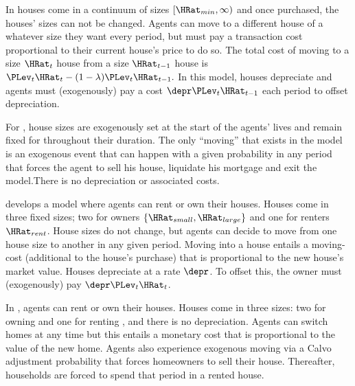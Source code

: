 \documentclass[PortfolioChoiceWithRiskyHousing]{subfiles}
\begin{document}
In \cite{Cocco2004rfs} houses come in a continuum of sizes $[\HRat_{min},\infty)$ and once purchased, the houses' sizes can not be changed. Agents can move to a different house of a whatever size they want every period, but must pay a transaction cost proportional to their current house's price to do so. The total cost of moving to a size
$\HRat_{t}$ house from a size $\HRat_{t-1}$ house is $\PLev_{t} \HRat_{t} - (1 - \lambda) \PLev_{t} \HRat_{t-1}.$ In this model, houses depreciate and agents must (exogenously) pay a cost $\depr \PLev_{t} \HRat_{t-1}$ each period to offset depreciation.

For \cite{Campbell2003}, house sizes are exogenously set at the start of the agents' lives and remain fixed for throughout their duration.  The only ``moving'' that exists in the model is an exogenous event that can happen with a given probability in any period that forces the agent to sell his house, liquidate his mortgage and exit the model.There is no depreciation or associated costs.

\cite{Brandsaas2021} develops a model where agents can rent or own their houses. Houses come in three fixed sizes; two for owners $\{\HRat_{small},\HRat_{large}\}$ and one for renters $\HRat_{rent}$. House sizes do not change, but agents can decide to move from one house size to another in any given period. Moving into a house entails a moving-cost (additional to the house's purchase) that is proportional to the new house's market value. Houses depreciate at a rate $\depr$. To offset this, the owner must (exogenously)
pay $\depr \PLev_{t} \HRat_{t}$.

In \cite{Paz2021}, agents can rent or own their houses. Houses come in three sizes: two for owning and one for renting \citep[as in][]{Brandsaas2021}, and there is no depreciation. Agents can switch homes at any time but this entails a monetary cost that is proportional to the value of the new home. Agents also experience exogenous moving via a Calvo adjustment probability that forces homeowners to sell their house. Thereafter, households are forced to spend that period in a rented house.
\end{document}
